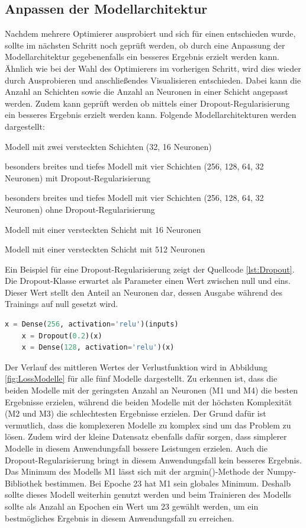 \subsection{Anpassen der Modellarchitektur}
Nachdem mehrere Optimierer ausprobiert und sich für einen entschieden wurde, sollte im nächsten Schritt noch geprüft werden, ob durch eine Anpassung der Modellarchitektur
gegebenenfalls ein besseres Ergebnis erzielt werden kann. Ähnlich wie bei der Wahl des Optimierers im vorherigen Schritt, wird dies wieder durch Ausprobieren und 
anschließendes Visualisieren entschieden. Dabei kann die Anzahl an Schichten sowie die Anzahl an Neuronen in einer Schicht angepasst werden.
Zudem kann geprüft werden ob mittels einer Dropout-Regularisierung ein besseres Ergebnis erzielt werden kann. 
Folgende Modellarchitekturen werden dargestellt:
\begin{description}[style=multiline,leftmargin=3cm,font=\bfseries, nolistsep]
    \item[M1] Modell mit zwei versteckten Schichten (32, 16 Neuronen)
    \item[M2] besonders breites und tiefes Modell mit vier Schichten (256, 128, 64, 32 Neuronen) mit Dropout-Regularisierung
    \item[M3] besonders breites und tiefes Modell mit vier Schichten (256, 128, 64, 32 Neuronen) ohne Dropout-Regularisierung
    \item[M4] Modell mit einer versteckten Schicht mit 16 Neuronen
    \item[M5] Modell mit einer versteckten Schicht mit 512 Neuronen
\end{description}
Ein Beispiel für eine Dropout-Regularisierung zeigt der Quellcode \ref*{lst:Dropout}. Die Dropout-Klasse erwartet als Parameter einen Wert zwischen null und eins. 
Dieser Wert stellt den Anteil an Neuronen dar, dessen Ausgabe während des Trainings auf null gesetzt wird.
\begin{lstlisting}[language = python, caption={Wahl der Lernrate},captionpos=b, label = lst:Learnrate, floatplacement=H]
    x = Dense(256, activation='relu')(inputs)
    x = Dropout(0.2)(x)
    x = Dense(128, activation='relu')(x)
\end{lstlisting}
Der Verlauf des mittleren Wertes der Verlustfunktion wird in Abbildung \ref*{fig:LossModelle} für alle fünf Modelle dargestellt. Zu erkennen ist, dass die beiden Modelle mit 
der geringsten Anzahl an Neuronen (M1 und M4) die besten Ergebnisse erzielen, während die beiden Modelle mit der höchsten Komplexität (M2 und M3) die schlechtesten Ergebnisse
erzielen. Der Grund dafür ist vermutlich, dass die komplexeren Modelle zu komplex sind um das Problem zu lösen. Zudem wird der kleine Datensatz ebenfalls dafür sorgen,
dass simplerer Modelle in diesem Anwendungsfall bessere Leistungen erzielen. Auch die Dropout-Regularisierung bringt in diesem Anwendungsfall kein besseres Ergebnis. Das Minimum
des Modells M1 lässt sich mit der argmin()-Methode der Numpy-Bibliothek bestimmen. Bei Epoche 23 hat M1 sein globales Minimum. Deshalb sollte dieses Modell weiterhin genutzt werden
und beim Trainieren des Modells sollte als Anzahl an Epochen ein Wert um 23 gewählt werden, um ein bestmögliches Ergebnis in diesem Anwendungsfall zu erreichen.

